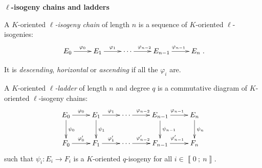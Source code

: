 \documentclass[10pt]{beamer}
\theoremstyle{plain}
\theoremstyle{definition}
\newcommand{\Z}{\mathbb{Z}}
\newcommand{\mO}{\mathcal{O}}
\renewcommand{\i}[2]{\left\llbracket #1~;~#2\right\rrbracket}
\renewcommand{\(}{\left(}
\renewcommand{\)}{\right)}
\newcommand{\mf}[1]{\mathfrak{#1}}
\begin{document}
\begin{frame}

\textbf{$\ell$-isogeny chains and ladders}

\begin{definition}
A $K$-oriented \emph{$\ell$-isogeny chain} of length $n$ is a sequence of $K$-oriented $\ell$-isogenies:
\[\xymatrix{
E_0 \ar[r]^{\varphi_0} & E_1 \ar[r]^{\varphi_{1}}& \cdots \ar[r]^{\varphi_{n-2}} & E_{n-1} \ar[r]^{\varphi_{n-1}} & E_n
}.\]

It is \emph{descending}, \emph{horizontal} or \emph{ascending} if all the $\varphi_i$ are.

\pause

A $K$-oriented \emph{$\ell$-ladder} of length $n$ and degree $q$ is a commutative diagram of $K$-oriented $\ell$-isogeny chains:
\[\xymatrix{
E_0 \ar[d]^{\psi_0} \ar[r]^{\varphi_0} & E_1\ar[d]^{\psi_1} \ar[r]^{\varphi_{1}}& \cdots \ar[r]^{\varphi_{n-2}} & E_{n-1} \ar[d]^{\psi_{n-1}} \ar[r]^{\varphi_{n-1}} & E_n \ar[d]^{\psi_n}\\
F_0 \ar[r]^{\varphi'_0} & F_1 \ar[r]^{\varphi'_{1}}& \cdots \ar[r]^{\varphi'_{n-2}} & F_{n-1} \ar[r]^{\varphi'_{n-1}} & F_n
}\]
such that $\psi_i : E_i\longrightarrow F_i$ is a $K$-oriented $q$-isogeny for all $i\in\i{0}{n}$.
\end{definition}

\end{frame}



\end{document}
